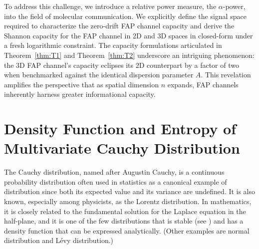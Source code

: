 \documentclass[conference]{IEEEtran}
\theoremstyle{definition}
\theoremstyle{plain}
\begin{document}
To address this challenge, we introduce a relative power measure, the $\alpha$-power, into the field of molecular communication. We explicitly define the signal space required to characterize the zero-drift FAP channel capacity and derive the Shannon capacity for the FAP channel in 2D and 3D spaces in closed-form under a fresh logarithmic constraint. The capacity formulations articulated in Theorem~\ref{thm:T1} and Theorem~\ref{thm:T2} underscore an intriguing phenomenon: the 3D FAP channel's capacity eclipses its 2D counterpart by a factor of two when benchmarked against the identical dispersion parameter \(A\). This revelation amplifies the perspective that as spatial dimension \(n\) expands, FAP channels inherently harness greater informational capacity.
\color{black}


%
%


\balance


\appendices
\section{Density Function and Entropy of Multivariate Cauchy Distribution}
\label{appendix-A}
The Cauchy distribution, named after Augustin Cauchy, is a continuous probability distribution often used in statistics as a canonical example of distribution since both its expected value and its variance are undefined. It is also known, especially among physicists, as the Lorentz distribution.
In mathematics, it is closely related to the fundamental solution for the Laplace equation in the half-plane, and it is one of the few distributions that is stable (see \cite{pierce1997application,fahs2012capacity}) and has a density function that can be expressed analytically. (Other examples are normal distribution and L\'{e}vy distribution.)
\end{document}
